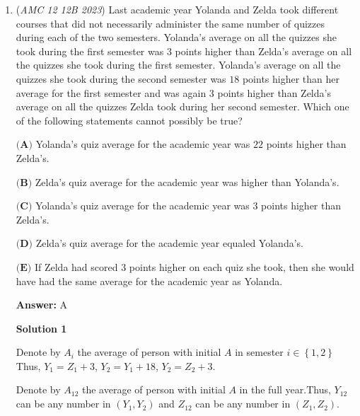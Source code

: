 \begin{enumerate}
 I denote $D$ as the perpendicular line from $C$ to $AB$, and assume $CD=k$. Here we know $\triangle BCD$ is a $30^\circ-60^\circ-90^\circ$ triangle. Hence $DC=\sqrt{3}k$ and $BC=2k$.

 Furthermore, due to the arithmetic progression, we know $AC=4k-6$. Hence, in $\triangle ACD$, 
 \[\left(4k-6\right)^{2}=\left(6+k\right)^{2}+3k^{2},\] 
 \[k=5.\]

 Thus, the area is equal to $\frac{1}{2}\cdot 6\cdot \sqrt{3} k=\boxed{\textbf{(E) } 15 \sqrt{3}}$.

 


	\item (\textit{AMC 12 12B 2023}) ﻿Last academic year Yolanda and Zelda took different courses that did not necessarily administer the same number of quizzes during each of the two semesters. Yolanda's average on all the quizzes she took during the first semester was $3$ points higher than Zelda's average on all the quizzes she took during the first semester. Yolanda's average on all the quizzes she took during the second semester was $18$ points higher than her average for the first semester and was again $3$ points higher than Zelda's average on all the quizzes Zelda took during her second semester. Which one of the following statements cannot possibly be true?


 $\textbf{(A)}$ Yolanda's quiz average for the academic year was $22$ points higher than Zelda's.


 $\textbf{(B)}$ Zelda's quiz average for the academic year was higher than Yolanda's.


 $\textbf{(C)}$ Yolanda's quiz average for the academic year was $3$ points higher than Zelda's.


 $\textbf{(D)}$ Zelda's quiz average for the academic year equaled Yolanda's.


 $\textbf{(E)}$ If Zelda had scored $3$ points higher on each quiz she took, then she would have had the same average for the academic year as Yolanda.


 
 \textbf{Answer: }A



\textbf{Solution 1}

Denote by $A_i$ the average of person with initial $A$ in semester $i \in \left\{1, 2 \right\}$Thus, $Y_1 = Z_1 + 3$, $Y_2 = Y_1 + 18$, $Y_2 = Z_2 + 3$.

 Denote by $A_{12}$ the average of person with initial $A$ in the full year.Thus, $Y_{12}$ can be any number in $\left( Y_1 , Y_2 \right)$ and $Z_{12}$ can be any number in $\left( Z_1 , Z_2 \right)$.


\end{enumerate}

